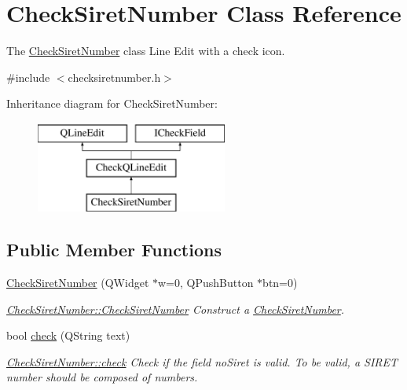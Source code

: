 \hypertarget{classCheckSiretNumber}{\section{Check\+Siret\+Number Class Reference}
\label{classCheckSiretNumber}
}


The \hyperlink{classCheckSiretNumber}{Check\+Siret\+Number} class Line Edit with a check icon.  




{\ttfamily \#include $<$checksiretnumber.\+h$>$}

Inheritance diagram for Check\+Siret\+Number\+:\begin{figure}[H]
\begin{center}
\leavevmode
\includegraphics[height=3.000000cm]{d7/d29/classCheckSiretNumber}
\end{center}
\end{figure}
\subsection*{Public Member Functions}
\begin{DoxyCompactItemize}
\item 
\hyperlink{classCheckSiretNumber_a0581c0a2d6c0c1a62dab77515422b194}{Check\+Siret\+Number} (Q\+Widget $\ast$w=0, Q\+Push\+Button $\ast$btn=0)
\begin{DoxyCompactList}\small\item\em \hyperlink{classCheckSiretNumber_a0581c0a2d6c0c1a62dab77515422b194}{Check\+Siret\+Number\+::\+Check\+Siret\+Number} Construct a \hyperlink{classCheckSiretNumber}{Check\+Siret\+Number}. \end{DoxyCompactList}\item 
bool \hyperlink{classCheckSiretNumber_aaf0a1411e380789062564bd992e72c1b}{check} (Q\+String text)
\begin{DoxyCompactList}\small\item\em \hyperlink{classCheckSiretNumber_aaf0a1411e380789062564bd992e72c1b}{Check\+Siret\+Number\+::check} Check if the field no\+Siret is valid. To be valid, a S\+I\+R\+E\+T number should be composed of numbers. \end{DoxyCompactList}\end{DoxyCompactItemize}
